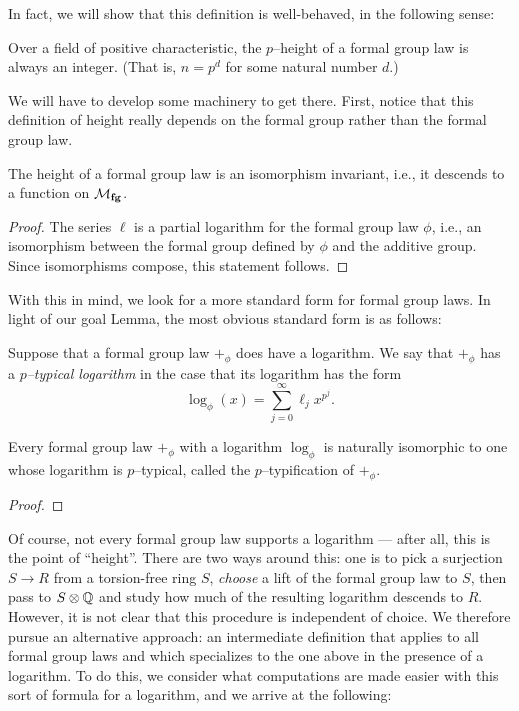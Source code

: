 In fact, we will show that this definition is well-behaved, in the following sense:
\begin{lemma}\label{FGLHeightIsAnInteger}
Over a field of positive characteristic, the $p$--height of a formal group law is always an integer.  (That is, $n = p^d$ for some natural number $d$.)
\end{lemma}
\noindent We will have to develop some machinery to get there.  First, notice that this definition of height really depends on the formal group rather than the formal group law.

\begin{lemma}
The height of a formal group law is an isomorphism invariant, i.e., it descends to a function on $\mathcal{M}_{\mathbf{fg}}$.
\end{lemma}
\begin{proof}
The series $\ell$ is a partial logarithm for the formal group law $\phi$, i.e., an isomorphism between the formal group defined by $\phi$ and the additive group.  Since isomorphisms compose, this statement follows.
\end{proof}

With this in mind, we look for a more standard form for formal group laws.  In light of our goal Lemma, the most obvious standard form is as follows:
\begin{definition}
Suppose that a formal group law $+_\phi$ does have a logarithm.  We say that $+_\phi$ has a \textit{$p$--typical logarithm} in the case that its logarithm has the form \[\log_\phi(x) = \sum_{j=0}^\infty \ell_j x^{p^j}.\]
\end{definition}

\begin{lemma}\label{EveryLogHaspTypification}
Every formal group law $+_\phi$ with a logarithm $\log_\phi$ is naturally isomorphic to one whose logarithm is $p$--typical, called the $p$--typification of $+_\phi$.
\end{lemma}
\begin{proof}
\end{proof}

Of course, not every formal group law supports a logarithm --- after all, this is the point of ``height''.  There are two ways around this: one is to pick a surjection $S \to R$ from a torsion-free ring $S$, \emph{choose} a lift of the formal group law to $S$, then pass to $S \otimes \mathbb{Q}$ and study how much of the resulting logarithm descends to $R$.  However, it is not clear that this procedure is independent of choice.  We therefore pursue an alternative approach: an intermediate definition that applies to all formal group laws and which specializes to the one above in the presence of a logarithm.  To do this, we consider what computations are made easier with this sort of formula for a logarithm, and we arrive at the following:


